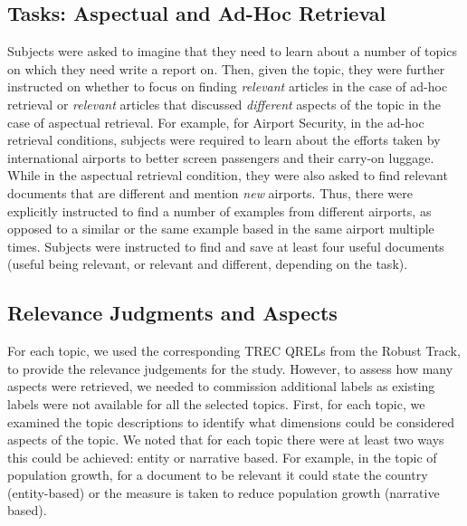 \subsection{Tasks: Aspectual and Ad-Hoc Retrieval}
Subjects were asked to imagine that they need to learn about a number of topics on which they need write a report on. Then, given the topic, they were further instructed on whether to focus on finding \emph{relevant} articles in the case of ad-hoc retrieval or \emph{relevant} articles that discussed \emph{different} aspects of the topic in the case of aspectual retrieval.  For example, for Airport Security, in the ad-hoc retrieval conditions, subjects were required to learn about the efforts taken by international airports to better screen passengers and their carry-on luggage. While in the aspectual retrieval condition, they were also asked to find relevant documents that are different and mention \emph{new} airports. Thus, there were explicitly instructed to find a number of examples from different airports, as opposed to a similar or the same example based in the same airport multiple times. Subjects were instructed to find and save at least four useful documents (useful being relevant, or relevant and different, depending on the task). 

\subsection{Relevance Judgments and Aspects}\label{sec:method:entities}
For each topic, we used the corresponding TREC QRELs from the Robust Track, to provide the relevance judgements for the study. However, to assess how many aspects were retrieved, we needed to commission additional labels as existing labels were not available for all the selected topics. First, for each topic, we examined the topic descriptions to identify what dimensions could be considered aspects of the topic. We noted that for each topic there were at least two ways this could be achieved: entity or narrative based. For example, in the topic of population growth, for a document to be relevant it could state the country (entity-based) or the measure is taken to reduce population growth (narrative based). 

